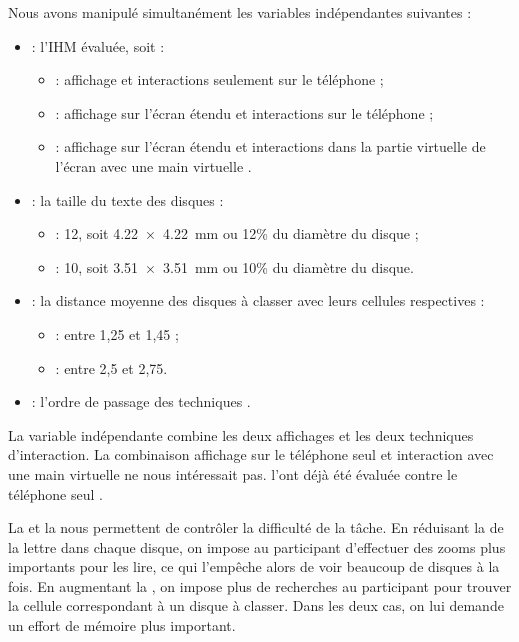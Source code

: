 Nous avons manipulé simultanément les variables indépendantes suivantes :
\begin{itemize}
  \item {} : l'IHM évaluée, soit :
  \begin{itemize}
    \item {} : affichage et interactions seulement sur le téléphone  ;
    \item {} : affichage sur l'écran étendu et interactions sur le téléphone  ;
    \item {} : affichage sur l'écran étendu et interactions dans la partie virtuelle de l'écran avec une main virtuelle .
  \end{itemize}
  \item {} : la taille du texte des disques :
  \begin{itemize}
    \item {} : \SI{12}{\pt}, soit \SI{4.22x4.22}{\mm} ou 12\% du diamètre du disque ;
    \item {} : \SI{10}{\pt}, soit \SI{3.51x3.51}{\mm} ou 10\% du diamètre du disque.
  \end{itemize}
  \item {} : la distance moyenne des disques à classer avec leurs cellules respectives :
  \begin{itemize}
    \item {} : entre 1,25 et 1,45 ;
    \item {} : entre 2,5 et 2,75.
  \end{itemize}
  \item {} : l'ordre de passage des techniques .
\end{itemize}
\medskip

La variable indépendante  combine les deux affichages et les deux techniques d'interaction. La combinaison affichage sur le téléphone seul et interaction avec une main virtuelle ne nous intéressait pas. \cite{Jones2012} l'ont déjà été évaluée contre le téléphone seul .

La  et la  nous permettent de contrôler la difficulté de la tâche. En réduisant la  de la lettre dans chaque disque, on impose au participant d'effectuer des zooms plus importants pour les lire, ce qui l'empêche alors de voir beaucoup de disques à la fois. En augmentant la , on impose plus de recherches au participant pour trouver la cellule correspondant à un disque à classer. Dans les deux cas, on lui demande un effort de mémoire plus important.

